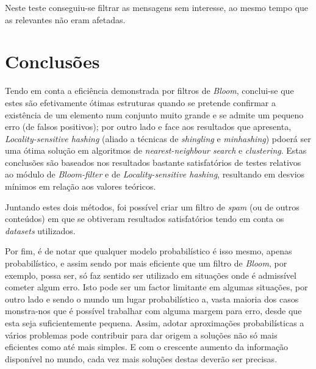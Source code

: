 \documentclass[a4paper,11pt,openright,oneside]{report}
\begin{document}
Neste teste conseguiu-se filtrar as mensagens sem interesse, ao mesmo tempo que as relevantes não eram afetadas.

\chapter{Conclusões}
\label{chap.conclusões}

Tendo em conta a eficiência demonstrada por filtros de \textit{Bloom}, conclui-se que estes são efetivamente ótimas estruturas quando se pretende confirmar a existência de um elemento num conjunto muito grande e se admite um pequeno erro (de falsos positivos); por outro lado e face aos resultados que apresenta, \textit{Locality-sensitive hashing} (aliado a técnicas de \textit{shingling} e \textit{minhashing}) pdoerá ser uma ótima solução em algoritmos de \textit{nearest-neighbour search} e \textit{clustering}. Estas conclusões são baseados nos resultados bastante satisfatórios de testes relativos ao módulo de \textit{Bloom-filter} e de \textit{Locality-sensitive hashing}, resultando em desvios mínimos em relação aos valores teóricos.

Juntando estes dois métodos, foi possível criar um filtro de \textit{spam} (ou de outros conteúdos) em que se obtiveram resultados satisfatórios tendo em conta os \textit{datasets} utilizados.

Por fim, é de notar que qualquer modelo probabilístico é isso mesmo, apenas probabilístico, e assim sendo por mais eficiente que um filtro de \textit{Bloom}, por exemplo, possa ser, só faz sentido ser utilizado em situações onde é admissível cometer algum erro. Isto pode ser um factor limitante em algumas situações, por outro lado e sendo o mundo um lugar probabilístico a, vasta maioria dos casos monstra-nos que é possível trabalhar com alguma margem para erro, desde que esta seja suficientemente pequena. Assim, adotar aproximações probabilísticas a vários problemas pode contribuir para dar origem a soluções não só mais eficientes como até mais simples. E com o crescente aumento da informação disponível no mundo, cada vez mais soluções destas deverão ser precisas.

\maketitle
\nocite{*}

\printbibliography[title={Referências}]
\end{document}
